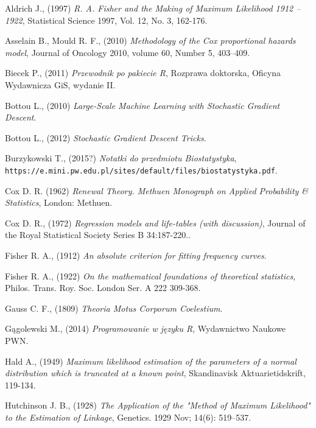 \begin{thebibliography}{99}

 Aldrich J., (1997) \textit{R. A. Fisher and the Making of Maximum Likelihood 1912 – 1922}, Statistical Science
1997, Vol. 12, No. 3, 162-176.

 Asselain B., Mould R. F., (2010) \textit{Methodology of the Cox proportional hazards model},  Journal of Oncology 2010, volume 60, Number 5,  403–409.

 Biecek P., (2011) \textit{Przewodnik po pakiecie R}, Rozprawa doktorska, Oficyna Wydawnicza GiS, wydanie II.

 Bottou L., (2010) \textit{Large-Scale Machine Learning with Stochastic Gradient Descent}.

 Bottou L., (2012) \textit{Stochastic Gradient Descent Tricks}.

 Burzykowski T., (2015?) \textit{Notatki do przedmiotu Biostatystyka}, \texttt{https://e.mini.pw.edu.pl/sites/default/files/biostatystyka.pdf}.

 Cox D. R. (1962) \textit{Renewal Theory. Methuen Monograph on Applied Probability
\& Statistics}, London: Methuen.

  Cox D. R., (1972) \textit{Regression models and life-tables (with discussion)}, Journal of the Royal Statistical Society Series B 34:187-220.. 



 Fisher R. A., (1912) \textit{An absolute criterion for fitting frequency curves}. 

 Fisher R. A., (1922) \textit{On the mathematical foundations of theoretical statistics}, Philos. Trans. Roy. Soc. London Ser. A 222 309-368.


 Gauss C. F., (1809) \textit{Theoria Motus Corporum Coelestium}.

 Gągolewski M., (2014) \textit{Programowanie w języku R}, Wydawnictwo Naukowe PWN.


 Hald A., (1949) \textit{Maximum likelihood estimation of the parameters of a normal distribution which is truncated at a known point}, Skandinavisk Aktuarietidskrift, 119-134.

 Hutchinson J. B., (1928) \textit{The Application of the "Method of Maximum Likelihood" to the Estimation of Linkage}, Genetics. 1929 Nov; 14(6): 519–537.



\end{thebibliography}
